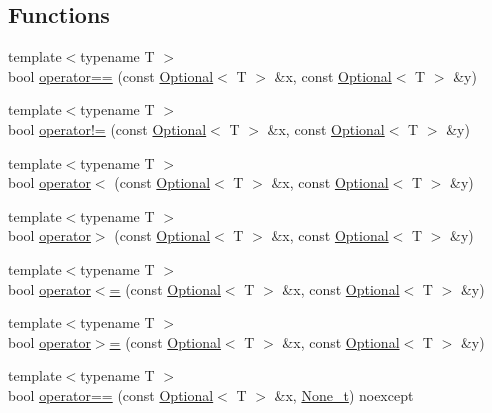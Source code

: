 \subsection*{Functions}
\begin{DoxyCompactItemize}
\item 
{\footnotesize template$<$typename T $>$ }\\bool \hyperlink{namespacemcurses_aa604611515dd88dd21ac8cb839588528}{operator==} (const \hyperlink{classmcurses_1_1Optional}{Optional}$<$ T $>$ \&x, const \hyperlink{classmcurses_1_1Optional}{Optional}$<$ T $>$ \&y)
\item 
{\footnotesize template$<$typename T $>$ }\\bool \hyperlink{namespacemcurses_a6d95bd0d73b2c0d5127cd67b744f47e3}{operator!=} (const \hyperlink{classmcurses_1_1Optional}{Optional}$<$ T $>$ \&x, const \hyperlink{classmcurses_1_1Optional}{Optional}$<$ T $>$ \&y)
\item 
{\footnotesize template$<$typename T $>$ }\\bool \hyperlink{namespacemcurses_a4446fbcb636faa08aba60b849f8036bb}{operator$<$} (const \hyperlink{classmcurses_1_1Optional}{Optional}$<$ T $>$ \&x, const \hyperlink{classmcurses_1_1Optional}{Optional}$<$ T $>$ \&y)
\item 
{\footnotesize template$<$typename T $>$ }\\bool \hyperlink{namespacemcurses_af8434742661ed6b43f86a0d38b725a84}{operator$>$} (const \hyperlink{classmcurses_1_1Optional}{Optional}$<$ T $>$ \&x, const \hyperlink{classmcurses_1_1Optional}{Optional}$<$ T $>$ \&y)
\item 
{\footnotesize template$<$typename T $>$ }\\bool \hyperlink{namespacemcurses_a8bcaf66160e4b46f3b160c4af4c289ac}{operator$<$=} (const \hyperlink{classmcurses_1_1Optional}{Optional}$<$ T $>$ \&x, const \hyperlink{classmcurses_1_1Optional}{Optional}$<$ T $>$ \&y)
\item 
{\footnotesize template$<$typename T $>$ }\\bool \hyperlink{namespacemcurses_a06a31f499cdd2fb20afdb35325498d90}{operator$>$=} (const \hyperlink{classmcurses_1_1Optional}{Optional}$<$ T $>$ \&x, const \hyperlink{classmcurses_1_1Optional}{Optional}$<$ T $>$ \&y)
\item 
{\footnotesize template$<$typename T $>$ }\\bool \hyperlink{namespacemcurses_a4b9e184df217e8cd040f1e006b074e2d}{operator==} (const \hyperlink{classmcurses_1_1Optional}{Optional}$<$ T $>$ \&x, \hyperlink{classmcurses_1_1None__t}{None\+\_\+t}) noexcept

\end{DoxyCompactItemize}
